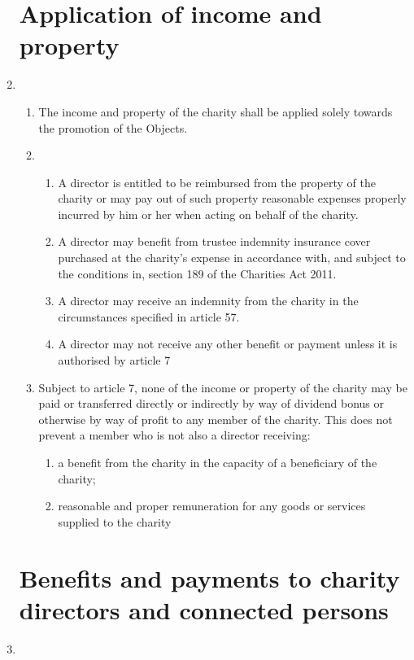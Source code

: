 \documentclass{article}
\begin{document}
\begin{enumerate}[label=\arabic*]
    \section{Application of income and property}
    \item \begin{enumerate}[label=(\arabic*)]
        \item The income and property of the charity shall be applied solely
        towards the promotion of the Objects.
        \item \begin{enumerate}[label=(\alph*)]
            \item A director is entitled to be reimbursed from the property
            of the charity or may pay out of such property reasonable
            expenses properly incurred by him or her when acting on
            behalf of the charity.
            \item A director may benefit from trustee indemnity insurance
            cover purchased at the charity's expense in accordance
            with, and subject to the conditions in, section 189 of the
            Charities Act 2011.
            \item A director may receive an indemnity from the charity in
            the circumstances specified in article 57.
            \item A director may not receive any other benefit or payment
            unless it is authorised by article 7
        \end{enumerate}
        \item Subject to article 7, none of the income or property of the
        charity may be paid or transferred directly or indirectly by way
        of dividend bonus or otherwise by way of profit to any member
        of the charity. This does not prevent a member who is not also a
        director receiving:
        \begin{enumerate}[label=(\alph*)]
            \item a benefit from the charity in the capacity of a beneficiary
            of the charity;
            \item reasonable and proper remuneration for any goods or
            services supplied to the charity
        \end{enumerate}
    \end{enumerate}
    
    \section{Benefits and payments to charity directors and connected persons}
    \item \begin{enumerate}[label=(\arabic*)]

\end{enumerate}
\end{enumerate}
\end{document}
